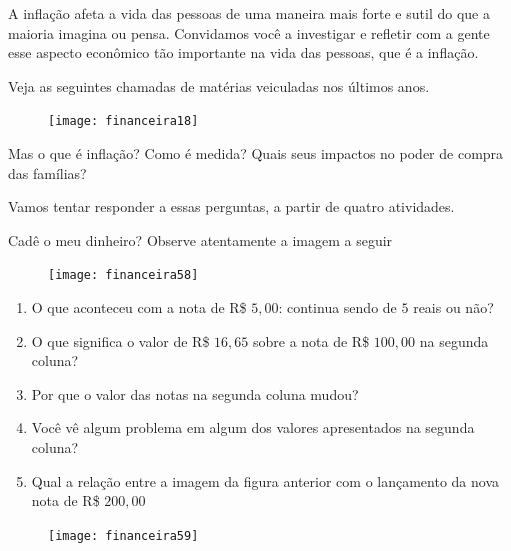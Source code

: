 A inflação afeta a vida das pessoas de uma maneira mais forte e sutil do que a maioria imagina ou pensa. Convidamos você a investigar e refletir com a gente esse aspecto econômico tão importante na vida das pessoas, que é a inflação.

Veja as seguintes chamadas de matérias veiculadas nos últimos anos.

\begin{figure}[H]
\centering

\texttt{[image: financeira18]}
\end{figure}

Mas o que é inflação? Como é medida? Quais seus impactos no poder de compra das famílias?

Vamos tentar responder a essas perguntas, a partir de quatro atividades.

\begin{task}{Cadê o meu dinheiro?}
Observe atentamente a imagem a seguir

\begin{figure}[H]
\centering

\texttt{[image: financeira58]}
\end{figure}
\begin{enumerate}
\item O que aconteceu com a nota de R\$ $5{,}00$: continua sendo de $5$ reais ou não?
\item O que significa o valor de R\$ $16{,}65$ sobre a nota de R\$ $100{,}00$ na segunda coluna?
\item Por que o valor das notas na segunda coluna mudou?
\item Você vê algum problema em algum dos valores apresentados na segunda coluna?
\item Qual a relação entre a imagem da figura anterior com o lançamento da nova nota de R\$ $200{,}00$
\end{enumerate}
\begin{figure}[H]
\centering

\texttt{[image: financeira59]}
\end{figure}
\end{task}



